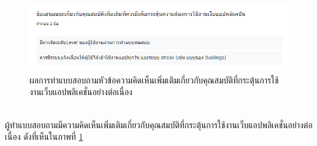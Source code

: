 \documentclass[12pt,oneside,openright,a4paper]{cpe-thai-project}
\begin{document}
\begin{figure}[!h]\centering
	\includegraphics[width=\textwidth, keepaspectratio=true]{image/appendix/1st/extra 2.png}
	\caption{{ผลการทำแบบสอบถามหัวข้อความคิดเห็นเพิ่มเติมเกี่ยวกับคุณสมบัติที่กระตุ้นการใช้งานเว็บแอปพลิเคชั่นอย่างต่อเนื่อง}}\label{fig:apdxExtraFeature2}
\end{figure}
\hspace{1cm}
\\ ผู้ทำแบบสอบถามมีความคิดเห็นเพิ่มเติมเกี่ยวกับคุณสมบัติที่กระตุ้นการใช้งานเว็บแอปพลิเคชั่นอย่างต่อเนื่อง ดังที่เห็นในภาพที่ \ref{fig:apdxExtraFeature2} 



\end{document}
